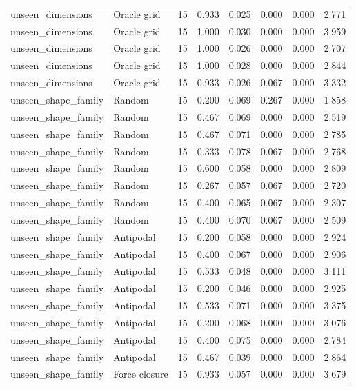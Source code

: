 {\begin{longtable}{llrrrrrr}
unseen\_dimensions & Oracle grid & 15 & 0.933 & 0.025 & 0.000 & 0.000 & 2.771 \\
unseen\_dimensions & Oracle grid & 15 & 1.000 & 0.030 & 0.000 & 0.000 & 3.959 \\
unseen\_dimensions & Oracle grid & 15 & 1.000 & 0.026 & 0.000 & 0.000 & 2.707 \\
unseen\_dimensions & Oracle grid & 15 & 1.000 & 0.028 & 0.000 & 0.000 & 2.844 \\
unseen\_dimensions & Oracle grid & 15 & 0.933 & 0.026 & 0.067 & 0.000 & 3.332 \\
unseen\_shape\_family & Random & 15 & 0.200 & 0.069 & 0.267 & 0.000 & 1.858 \\
unseen\_shape\_family & Random & 15 & 0.467 & 0.069 & 0.000 & 0.000 & 2.519 \\
unseen\_shape\_family & Random & 15 & 0.467 & 0.071 & 0.000 & 0.000 & 2.785 \\
unseen\_shape\_family & Random & 15 & 0.333 & 0.078 & 0.067 & 0.000 & 2.768 \\
unseen\_shape\_family & Random & 15 & 0.600 & 0.058 & 0.000 & 0.000 & 2.809 \\
unseen\_shape\_family & Random & 15 & 0.267 & 0.057 & 0.067 & 0.000 & 2.720 \\
unseen\_shape\_family & Random & 15 & 0.400 & 0.065 & 0.067 & 0.000 & 2.307 \\
unseen\_shape\_family & Random & 15 & 0.400 & 0.070 & 0.067 & 0.000 & 2.509 \\
unseen\_shape\_family & Antipodal & 15 & 0.200 & 0.058 & 0.000 & 0.000 & 2.924 \\
unseen\_shape\_family & Antipodal & 15 & 0.400 & 0.067 & 0.000 & 0.000 & 2.906 \\
unseen\_shape\_family & Antipodal & 15 & 0.533 & 0.048 & 0.000 & 0.000 & 3.111 \\
unseen\_shape\_family & Antipodal & 15 & 0.200 & 0.046 & 0.000 & 0.000 & 2.925 \\
unseen\_shape\_family & Antipodal & 15 & 0.533 & 0.071 & 0.000 & 0.000 & 3.375 \\
unseen\_shape\_family & Antipodal & 15 & 0.200 & 0.068 & 0.000 & 0.000 & 3.076 \\
unseen\_shape\_family & Antipodal & 15 & 0.400 & 0.075 & 0.000 & 0.000 & 2.784 \\
unseen\_shape\_family & Antipodal & 15 & 0.467 & 0.039 & 0.000 & 0.000 & 2.864 \\
unseen\_shape\_family & Force closure & 15 & 0.933 & 0.057 & 0.000 & 0.000 & 3.679 \\

\end{longtable}}
